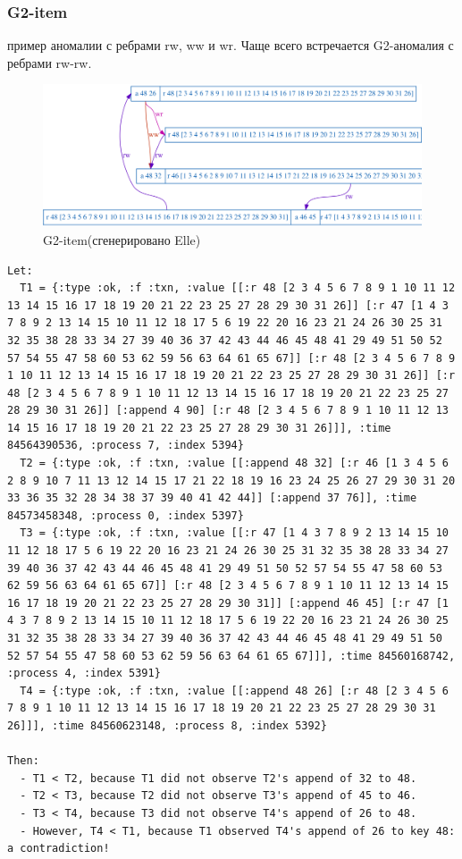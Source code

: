 \documentclass[12pt,  openany]{book}
\begin{document}
\subsubsection{G2-item}
пример аномалии с ребрами rw, ww и wr. Чаще всего встречается G2-аномалия с ребрами rw-rw.
\begin{figure}[H]
  \includegraphics[width=\textwidth]{prefix/7.png}
  \caption{G2-item(сгенерировано Elle)}
\end{figure}
\par
\begin{lstlisting}[caption={Пояснение к G2-item аномалии (сгенерировано Elle)}]
Let:
  T1 = {:type :ok, :f :txn, :value [[:r 48 [2 3 4 5 6 7 8 9 1 10 11 12 13 14 15 16 17 18 19 20 21 22 23 25 27 28 29 30 31 26]] [:r 47 [1 4 3 7 8 9 2 13 14 15 10 11 12 18 17 5 6 19 22 20 16 23 21 24 26 30 25 31 32 35 38 28 33 34 27 39 40 36 37 42 43 44 46 45 48 41 29 49 51 50 52 57 54 55 47 58 60 53 62 59 56 63 64 61 65 67]] [:r 48 [2 3 4 5 6 7 8 9 1 10 11 12 13 14 15 16 17 18 19 20 21 22 23 25 27 28 29 30 31 26]] [:r 48 [2 3 4 5 6 7 8 9 1 10 11 12 13 14 15 16 17 18 19 20 21 22 23 25 27 28 29 30 31 26]] [:append 4 90] [:r 48 [2 3 4 5 6 7 8 9 1 10 11 12 13 14 15 16 17 18 19 20 21 22 23 25 27 28 29 30 31 26]]], :time 84564390536, :process 7, :index 5394}
  T2 = {:type :ok, :f :txn, :value [[:append 48 32] [:r 46 [1 3 4 5 6 2 8 9 10 7 11 13 12 14 15 17 21 22 18 19 16 23 24 25 26 27 29 30 31 20 33 36 35 32 28 34 38 37 39 40 41 42 44]] [:append 37 76]], :time 84573458348, :process 0, :index 5397}
  T3 = {:type :ok, :f :txn, :value [[:r 47 [1 4 3 7 8 9 2 13 14 15 10 11 12 18 17 5 6 19 22 20 16 23 21 24 26 30 25 31 32 35 38 28 33 34 27 39 40 36 37 42 43 44 46 45 48 41 29 49 51 50 52 57 54 55 47 58 60 53 62 59 56 63 64 61 65 67]] [:r 48 [2 3 4 5 6 7 8 9 1 10 11 12 13 14 15 16 17 18 19 20 21 22 23 25 27 28 29 30 31]] [:append 46 45] [:r 47 [1 4 3 7 8 9 2 13 14 15 10 11 12 18 17 5 6 19 22 20 16 23 21 24 26 30 25 31 32 35 38 28 33 34 27 39 40 36 37 42 43 44 46 45 48 41 29 49 51 50 52 57 54 55 47 58 60 53 62 59 56 63 64 61 65 67]]], :time 84560168742, :process 4, :index 5391}
  T4 = {:type :ok, :f :txn, :value [[:append 48 26] [:r 48 [2 3 4 5 6 7 8 9 1 10 11 12 13 14 15 16 17 18 19 20 21 22 23 25 27 28 29 30 31 26]]], :time 84560623148, :process 8, :index 5392}

Then:
  - T1 < T2, because T1 did not observe T2's append of 32 to 48.
  - T2 < T3, because T2 did not observe T3's append of 45 to 46.
  - T3 < T4, because T3 did not observe T4's append of 26 to 48.
  - However, T4 < T1, because T1 observed T4's append of 26 to key 48: a contradiction!
\end{lstlisting}
\end{document}
